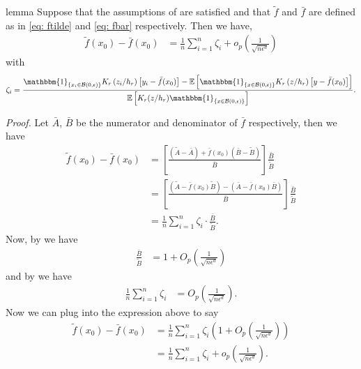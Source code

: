 \documentclass[11pt]{article}
\begin{document}
\begin{restatable}{lemma}{} \label{lemma: ftilde minus fbar}
    Suppose that the assumptions of  are satisfied and that $\tilde{f}$ and $\bar{f}$ are defined as in \cref{eq: ftilde} and \cref{eq: fbar} respectively. Then we have,
    \begin{align*}
        \tilde{f}(x_0) - \bar{f}(x_0) &= \frac{1}{n}\sum_{i = 1}^n\zeta_i + o_p\left(\frac{1}{\sqrt{n\epsilon^{d}}}\right) 
    \end{align*}
    with 
    \begin{equation}
        \zeta_i = \frac{\mathbbm{1}_{\{x_i \in \mathcal{B}(0, \epsilon)\}}K_r\left(z_i/h_r\right)\left[y_i - \bar{f}(x_0)\right] - \mathbb{E}\left[\mathbbm{1}_{\{x \in \mathcal{B}(0, \epsilon)\}}K_r\left(z/h_r\right)\left[y - \bar{f}(x_0)\right]\right]}{\mathbb{E}\left[K_r(z/h_r)\mathbbm{1}_{\{x\in \mathcal{B}(0, \epsilon)\}}\right]}. \label{eq: zeta definition}
    \end{equation}
\end{restatable}
\noindent \textit{Proof.} Let $\bar{A}$, $\bar{B}$ be the numerator and denominator of $\bar{f}$ respectively, then we have
\begin{align*}
    \tilde{f}(x_0) - \bar{f}(x_0) &=  \left[\frac{(\tilde{A}-\bar{A}) + \bar{f}(x_0)\left(\bar{B} - \tilde{B}\right)}{\bar{B}}\right]\frac{\bar{B}}{\tilde{B}} \\
    &= \left[\frac{\left(\tilde{A} - \bar{f}(x_0)\tilde{B}\right)- \left(\bar{A} - \bar{f}(x_0)\bar{B}\right)}{\bar{B}}\right]\frac{\bar{B}}{\tilde{B}} \\
    &= \frac{1}{n}\sum_{i = 1}^n\zeta_i\cdot \frac{\bar{B}}{\tilde{B}}.
\end{align*}
Now, by  we have
\begin{align*}
    \frac{\bar{B}}{\tilde{B}} &= 1 + O_p\left(\frac{1}{\sqrt{n\epsilon^d}}\right)
\end{align*}
and by  we have
\begin{align*}
     \frac{1}{n} \sum_{i = 1}^n \zeta_i&=  O_p\left(\frac{1}{\sqrt{n\epsilon^d}}\right).
\end{align*}
Now we can plug into the expression above to say
\begin{align*}
    \tilde{f}(x_0) - \bar{f}(x_0) &= \frac{1}{n}\sum_{i = 1}^n\zeta_i\left(1 + O_p\left(\frac{1}{\sqrt{n\epsilon^d}}\right)\right) \\
    &= \frac{1}{n}\sum_{i = 1}^n\zeta_i + o_p\left(\frac{1}{\sqrt{n\epsilon^d}}\right). \label{eq: ftilde fbar decomp}
\end{align*}
\end{document}
